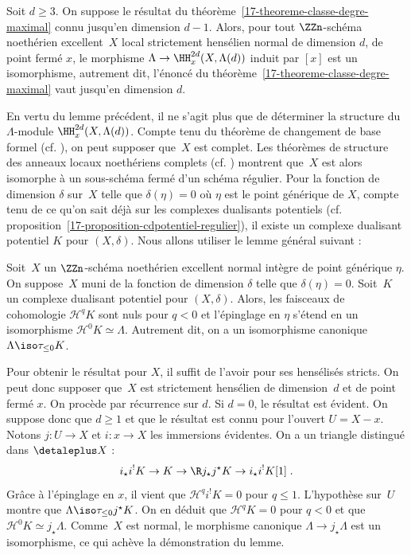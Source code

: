 \documentclass[10pt]{../fichiers-configuration-latex/smfart}
\begin{document}
\begin{lemme2}\label{17-lemme-recurrence-theoreme-classe-degre-maximal}
Soit $d\geq 3$.
On suppose le résultat du théorème~\ref{17-theoreme-classe-degre-maximal}
connu jusqu'en dimension $d-1$. Alors, pour tout $\ZZn$-schéma noethérien
excellent $X$ local strictement hensélien normal de dimension $d$, de point
fermé $x$, le morphisme $\Lambda\to \HH^{2d}_x(X,\Lambda(d))$
induit par $[x]$ est un isomorphisme, autrement dit, l'énoncé du
théorème~\ref{17-theoreme-classe-degre-maximal} vaut jusqu'en dimension $d$.
\end{lemme2}

En vertu du lemme précédent, il ne s'agit plus que de déterminer la
structure du $\Lambda$-module $\HH^{2d}_x(X,\Lambda(d))$. Compte tenu du
théorème de changement de base formel (cf.
\cite[corollary~6.6.4]{TUBULAR@Fujiwara}),
on peut supposer que $X$ est complet.
Les théorèmes de structure des anneaux locaux noethériens
complets (cf. )
montrent que $X$ est alors isomorphe à un
sous-schéma fermé d'un schéma régulier. Pour la fonction de dimension
$\delta$ sur $X$ telle que $\delta(\eta)=0$ où $\eta$ est le point
générique de $X$, compte tenu de ce qu'on sait déjà sur les complexes
dualisants potentiels (cf.
proposition~\ref{17-proposition-cdpotentiel-regulier}),
il existe un complexe dualisant potentiel
$K$ pour $(X,\delta)$. Nous allons utiliser le lemme général suivant :

\begin{lemme2}\label{17-lemme-structure-cohomologie-negative-cdp-normal}
Soit $X$ un $\ZZn$-schéma noethérien excellent normal intègre de point
générique $\eta$. On suppose $X$ muni de la fonction de dimension $\delta$
telle que $\delta(\eta)=0$. Soit $K$ un complexe dualisant potentiel pour
$(X,\delta)$. Alors, les faisceaux de cohomologie ${\mathscr H}^qK$  sont
nuls pour $q<0$ et l'épinglage en $\eta$ s'étend en un isomorphisme
${\mathscr H}^0K\simeq \Lambda$. Autrement dit, on a un isomorphisme
canonique $\Lambda\iso \tau_{\leq 0}K$.
\end{lemme2}

Pour obtenir le résultat pour $X$, il suffit de l'avoir pour ses hensélisés
stricts. On peut donc supposer que $X$ est strictement hensélien de
dimension $d$ et de point fermé $x$. On procède par récurrence sur $d$.
Si $d=0$, le résultat est évident. On suppose donc que $d\geq 1$ et que le
résultat est connu pour l'ouvert $U=X-x$. Notons $j\colon U\to X$ et
$i\colon x\to X$ les immersions évidentes. On a un triangle distingué
dans $\detaleplus X$ :
\[i_\star i^!K\to K\to \R j_\star j^\star K\to i_\star
i^! K[1]\;\text{.}\]
Grâce à l'épinglage en $x$, il vient que ${\mathscr H}^q i^!K=0$ pour
$q\leq 1$. L'hypothèse sur $U$ montre que $\Lambda\iso \tau_{\leq
0}j^\star K$. On en déduit que ${\mathscr H}^q K=0$ pour $q<0$ et que
${\mathscr H}^0K\simeq j_\star \Lambda$. Comme $X$ est normal, le morphisme
canonique $\Lambda\to j_\star \Lambda$ est un isomorphisme, ce qui achève
la démonstration du lemme.
\end{document}
